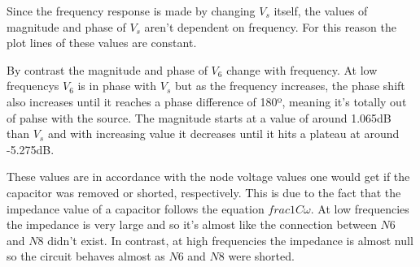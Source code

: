 Since the frequency response is made by changing $V_s$ itself, the values of magnitude and phase of $V_s$ aren't dependent on frequency. For this reason the plot lines of these values are constant.

By contrast the magnitude and phase of $V_6$ change with frequency. At low frequencys $V_6$ is in phase with $V_s$ but as the frequency increases, the phase shift also increases until it reaches a phase difference of 180º, meaning it's totally out of pahse with the source. The magnitude starts at a value of around 1.065dB than $V_s$ and with increasing value it decreases until it hits a plateau at around -5.275dB. 

These values are in accordance with the node voltage values one would get if the capacitor was removed or shorted, respectively. This is due to the fact that the impedance value of a capacitor follows the equation $frac{1}{C\omega}$. At low frequencies the impedance is very large and so it's almost like the connection between $N6$ and $N8$ didn't exist. In contrast, at high frequencies the impedance is almost null so the circuit behaves almost as $N6$ and $N8$ were shorted.






